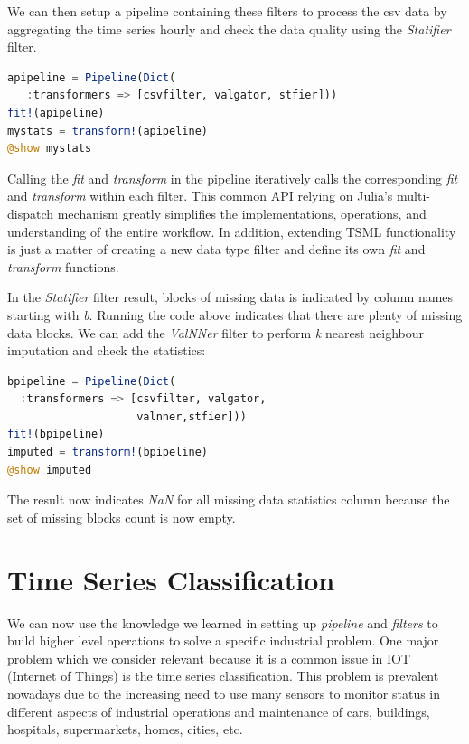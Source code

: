 \documentclass{juliacon}
\begin{document}
We can then setup a pipeline containing these filters to process the csv data
by aggregating the time series hourly and check the data quality using the
\emph{Statifier} filter.

\begin{lstlisting}[language = Julia]
apipeline = Pipeline(Dict(
   :transformers => [csvfilter, valgator, stfier]))
fit!(apipeline)
mystats = transform!(apipeline)
@show mystats
\end{lstlisting}

Calling the \emph{fit} and \emph{transform} in the pipeline
iteratively calls the corresponding \emph{fit} and \emph{transform} within each filter. 
This common API relying on Julia's multi-dispatch mechanism greatly simplifies the implementations, operations, 
and understanding of the entire workflow. In addition, extending TSML functionality is just a 
matter of creating a new data type filter and define its own  \emph{fit} and \emph{transform} 
functions.

In the \emph{Statifier} filter result, blocks of missing data is indicated by column names starting
with \emph{b}. Running the code above indicates that there are plenty of missing data blocks.
We can add the \emph{ValNNer} filter to perform \emph{k} nearest neighbour imputation and check
the statistics:

\begin{lstlisting}[language = Julia]
bpipeline = Pipeline(Dict(
  :transformers => [csvfilter, valgator, 
                    valnner,stfier]))
fit!(bpipeline)
imputed = transform!(bpipeline)
@show imputed
\end{lstlisting}

The result now indicates \emph{NaN} for all missing data statistics column because the set 
of missing blocks count is now empty.

\section{Time Series Classification}

We can now use the knowledge we learned in setting up 
\emph{pipeline} and \emph{filters} to build higher level
operations to solve a specific industrial problem. One major problem
which we consider relevant because it is a common issue in IOT (Internet of Things) 
 is the time series classification. This problem is prevalent nowadays 
due to the increasing need to use many sensors to monitor status in different aspects of industrial
operations and maintenance of cars, buildings, hospitals, supermarkets, homes, cities, etc.
\end{document}
